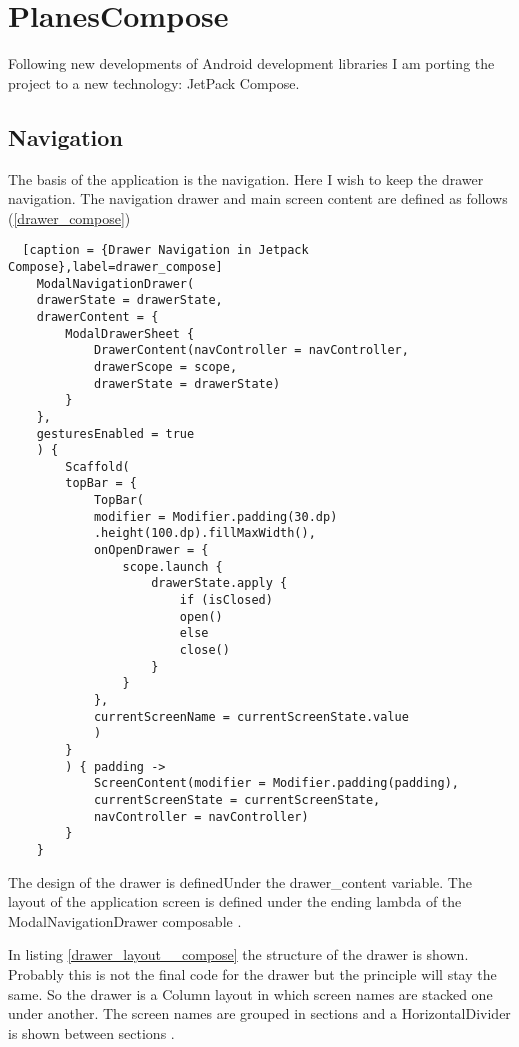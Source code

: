 \section{PlanesCompose}

Following new developments of Android development libraries I am porting the project to a new technology: JetPack Compose. 

\subsection{Navigation}

The basis of the application is the navigation. Here I wish to keep the drawer navigation. 
The navigation drawer and main screen content are defined as follows (\ref{drawer_compose})

\begin{lstlisting}  [caption = {Drawer Navigation in Jetpack Compose},label=drawer_compose]
	ModalNavigationDrawer(
	drawerState = drawerState,
	drawerContent = {
		ModalDrawerSheet {
			DrawerContent(navController = navController,
			drawerScope = scope,
			drawerState = drawerState)
		}
	},
	gesturesEnabled = true
	) {
		Scaffold(
		topBar = {
			TopBar(
			modifier = Modifier.padding(30.dp)
			.height(100.dp).fillMaxWidth(),
			onOpenDrawer = {
				scope.launch {
					drawerState.apply {
						if (isClosed)
						open()
						else
						close()
					}
				}
			},
			currentScreenName = currentScreenState.value
			)
		}
		) { padding ->
			ScreenContent(modifier = Modifier.padding(padding),
			currentScreenState = currentScreenState,
			navController = navController)
		}
	}
\end{lstlisting}

The design of the drawer is definedUnder the drawer\_content variable. The layout of the application screen is defined under the ending lambda of the ModalNavigationDrawer composable . 

In listing \ref{drawer_layout__compose} the structure of the drawer is shown. Probably this is not the final code for the drawer but the principle will stay the same. So the drawer is a Column layout in which screen names are stacked one under another. The screen names are grouped in sections and a HorizontalDivider is shown between sections .

